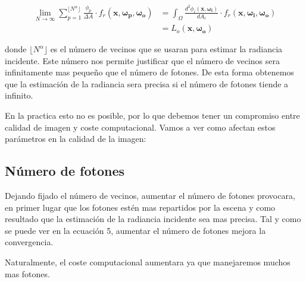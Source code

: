\documentclass{article}
\begin{document}
\begin{equation}
\begin{split}
\lim_{N\to\infty} \sum_{p=1}^{\lfloor N^{\alpha}\rfloor} \frac{\phi_{p}}{\Delta A} \cdot f_r(\mathbf{x}, \mathbf{\omega_{p}}, \mathbf{\omega_{o}}) &= \int_{\Omega} \frac{d^{2}\phi_{i}(\mathbf{x}, \mathbf{\omega_{i}})}{dA_{i}} \cdot f_r(\mathbf{x}, \mathbf{\omega_{i}}, \mathbf{\omega_{o}}) \\
  &= L_o(\mathbf{x}, \mathbf{\omega_{o}})
\end{split}
\end{equation}

donde \(\lfloor N^{\alpha} \rfloor\) es el número de vecinos que se usaran para estimar la radiancia incidente. Este número nos permite justificar que el número de vecinos sera infinitamente mas pequeño que el número de fotones.
De esta forma obtenemos que la estimación de la radiancia sera precisa si el número de fotones tiende a infinito. \cite{HenrikCourse8}

En la practica esto no es posible, por lo que debemos tener un compromiso entre calidad de imagen y coste computacional. Vamos a ver como afectan estos parámetros en la calidad de la imagen:

\subsection{Número de fotones}
Dejando fijado el número de vecinos, aumentar el número de fotones provocara,
en primer lugar que los fotones estén mas repartidos por la escena y como resultado
que la estimación de la radiancia incidente sea mas precisa. Tal y como se puede ver en la ecuación 5, aumentar el número de fotones mejora la convergencia.

Naturalmente, el coste computacional aumentara ya que manejaremos muchos mas fotones.
\end{document}
